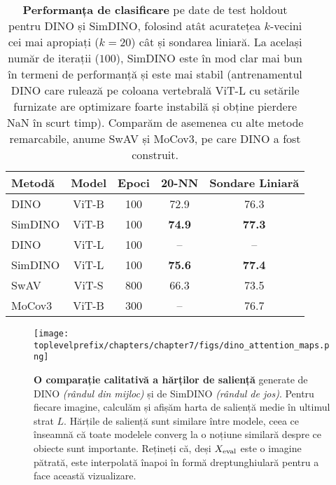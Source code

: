 \documentclass[../../book-main_ro.tex]{subfiles}
\begin{document}
\begin{table}
    \centering
    \begin{tabular}{@{}lcccc@{}} %
        \toprule
        Metodă & Model & Epoci & 20-NN & Sondare Liniară 
        \\
        \midrule 
        DINO & ViT-B & 100 & 72.9 & 76.3 \\
        SimDINO & ViT-B & 100 & \bf 74.9 & \bf 77.3 \\
        DINO & ViT-L & 100 & -- & -- \\
        SimDINO & ViT-L & 100 & \bf 75.6 & \bf 77.4 \\
        \midrule
        \color{gray} SwAV & \color{gray} ViT-S & \color{gray} 800 & \color{gray} 66.3 & \color{gray} 73.5 \\
        \color{gray} MoCov3 & \color{gray} ViT-B & \color{gray} 300  & \color{gray} -- & \color{gray} 76.7 \\
        \bottomrule
    \end{tabular}
    \caption{\small\textbf{Performanța de clasificare} pe date de test holdout pentru DINO și SimDINO, folosind atât acuratețea \(k\)-vecini cei mai apropiați (\(k = 20\)) cât și sondarea liniară. La același număr de iterații (\(100\)), SimDINO este în mod clar mai bun în termeni de performanță și este mai stabil (antrenamentul DINO care rulează pe coloana vertebrală ViT-L cu setările furnizate are optimizare foarte instabilă și obține pierdere NaN în scurt timp). Comparăm de asemenea cu alte metode remarcabile, anume SwAV și MoCov3, pe care DINO a fost construit.}
    \label{tab:dino_imagenet_linear_probing}
\end{table}

\begin{figure}
    \centering 
    \texttt{[image: \\toplevelprefix/chapters/chapter7/figs/dino\_attention\_maps.png]}
    \caption{\small\textbf{O comparație calitativă a hărților de saliență} generate de DINO \textit{(rândul din mijloc)} și de SimDINO \textit{(rândul de jos)}. Pentru fiecare imagine, calculăm și afișăm harta de saliență medie în ultimul strat \(L\). Hărțile de saliență sunt similare între modele, ceea ce înseamnă că toate modelele converg la o noțiune similară despre ce obiecte sunt importante. Rețineți că, deși \(X_{\mathrm{eval}}\) este o imagine pătrată, este interpolată înapoi în formă dreptunghiulară pentru a face această vizualizare.}
    \label{fig:dino_attention_maps_saliency}
\end{figure}
\end{document}
